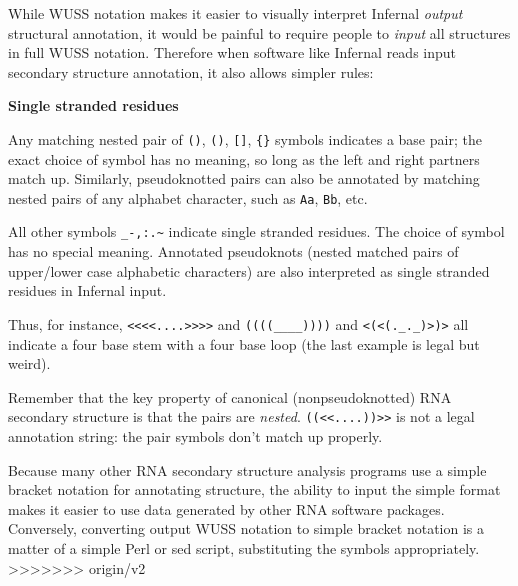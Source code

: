 While WUSS notation makes it easier to visually interpret Infernal
\emph{output} structural annotation, it would be painful to require
people to \emph{input} all structures in full WUSS notation. Therefore
when software like Infernal reads input secondary structure
annotation, it also allows simpler rules:

\begin{sreitems}{\textbf{Single stranded residues}}
\item [\textbf{Base pairs}]
  Any matching nested pair of \verb+()+, \verb+()+, \verb+[]+, \verb+{}+
  symbols indicates a base pair; the exact choice of symbol has no
  meaning, so long as the left and right partners match up.
  Similarly, pseudoknotted pairs can also be annotated by matching nested
  pairs of any alphabet character, such as \verb+Aa+, \verb+Bb+, etc.

\item [\textbf{Single stranded residues}]
  All other symbols \verb+_-,:.~+
  indicate single stranded residues.
  The choice of symbol has no special meaning.
  Annotated pseudoknots (nested matched pairs of upper/lower case
  alphabetic characters) are also interpreted as single
  stranded residues in Infernal input.
\end{sreitems}

Thus, for instance, \verb+<<<<....>>>>+ and \verb+((((____))))+ and
\verb+<(<(._._)>)>+ all indicate a four base stem with a four base
loop (the last example is legal but weird).

Remember that the key property of canonical (nonpseudoknotted) RNA
secondary structure is that the pairs are \emph{nested}.
\verb+((<<....))>>+ is not a legal annotation string: the pair symbols
don't match up properly. 

Because many other RNA secondary structure analysis programs use a
simple bracket notation for annotating structure, the ability to input
the simple format makes it easier to use data generated by other RNA
software packages. Conversely, converting output WUSS notation to
simple bracket notation is a matter of a simple Perl or sed script,
substituting the symbols appropriately.
>>>>>>> origin/v2

